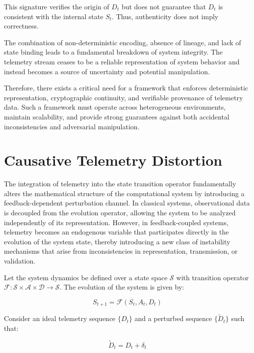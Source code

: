 This signature verifies the origin of $D_t$ but does not guarantee that $D_t$ is consistent with the internal state $S_t$. Thus, authenticity does not imply correctness.

The combination of non-deterministic encoding, absence of lineage, and lack of state binding leads to a fundamental breakdown of system integrity. The telemetry stream ceases to be a reliable representation of system behavior and instead becomes a source of uncertainty and potential manipulation.

Therefore, there exists a critical need for a framework that enforces deterministic representation, cryptographic continuity, and verifiable provenance of telemetry data. Such a framework must operate across heterogeneous environments, maintain scalability, and provide strong guarantees against both accidental inconsistencies and adversarial manipulation.

\section{Causative Telemetry Distortion}

The integration of telemetry into the state transition operator fundamentally alters the mathematical structure of the computational system by introducing a feedback-dependent perturbation channel. In classical systems, observational data is decoupled from the evolution operator, allowing the system to be analyzed independently of its representation. However, in feedback-coupled systems, telemetry becomes an endogenous variable that participates directly in the evolution of the system state, thereby introducing a new class of instability mechanisms that arise from inconsistencies in representation, transmission, or validation.

Let the system dynamics be defined over a state space $\mathcal{S}$ with transition operator $\mathcal{F}: \mathcal{S} \times \mathcal{A} \times \mathcal{D} \rightarrow \mathcal{S}$. The evolution of the system is given by:

\begin{equation}
S_{t+1} = \mathcal{F}(S_t, A_t, D_t)
\end{equation}

Consider an ideal telemetry sequence $\{D_t\}$ and a perturbed sequence $\{\tilde{D}_t\}$ such that:

\begin{equation}
\tilde{D}_t = D_t + \delta_t
\end{equation}

